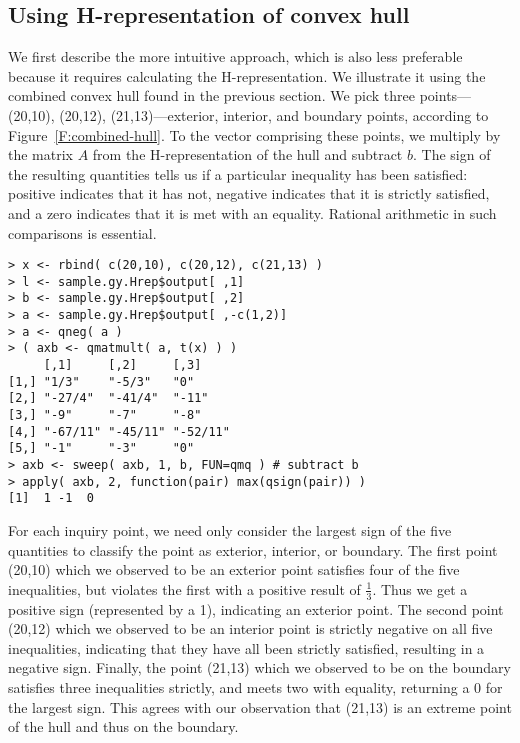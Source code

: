 \subsection{Using H-representation of convex hull}
\label{S:H-rep inquiry}
We first describe the more intuitive approach, which is also less preferable because 
it requires calculating the H-representation.  We illustrate it using the combined 
convex hull found in the previous section.
We pick three points---(20,10), (20,12), (21,13)---exterior, interior, and boundary 
points, according to Figure~\ref{F:combined-hull}.  
To the vector comprising these points, we multiply
 by the matrix $A$ from the H-representation of the hull 
 and subtract $b$.  The sign of the resulting quantities tells us if a 
 particular inequality has been satisfied: positive indicates that it has not, 
 negative indicates that it is strictly satisfied, and a zero indicates that it is
 met with an equality.  Rational arithmetic in such comparisons is essential.
\begin{verbatim}
> x <- rbind( c(20,10), c(20,12), c(21,13) )
> l <- sample.gy.Hrep$output[ ,1]
> b <- sample.gy.Hrep$output[ ,2]
> a <- sample.gy.Hrep$output[ ,-c(1,2)]
> a <- qneg( a )
> ( axb <- qmatmult( a, t(x) ) )
     [,1]     [,2]     [,3]    
[1,] "1/3"    "-5/3"   "0"     
[2,] "-27/4"  "-41/4"  "-11"   
[3,] "-9"     "-7"     "-8"    
[4,] "-67/11" "-45/11" "-52/11"
[5,] "-1"     "-3"     "0"     
> axb <- sweep( axb, 1, b, FUN=qmq ) # subtract b
> apply( axb, 2, function(pair) max(qsign(pair)) )
[1]  1 -1  0
\end{verbatim}
For each inquiry point, we need only consider the largest sign of the five quantities
to classify the point as exterior, interior, or boundary.
 The first point (20,10) which we observed to be an exterior point 
 satisfies four of the five inequalities, but violates the first with
 a positive result of $\frac{1}{3}$.  Thus we get a positive sign (represented by a 1), 
 indicating an exterior point.  The second point (20,12) which we observed to be an 
 interior point is strictly negative on all five inequalities, indicating that they 
 have all been strictly satisfied, resulting in a negative sign.  Finally, the point (21,13) which we observed to be on the boundary satisfies three inequalities 
 strictly, and meets two with equality, returning a 0 for the largest sign.  
 This agrees with our observation 
 that (21,13) is an extreme point of the hull and thus on the boundary.


